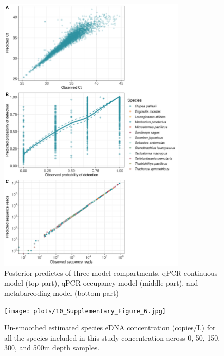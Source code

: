 \documentclass[9pt,twoside,lineno]{pnas-SI}
\begin{document}
\begin{figure}
\centering
\includegraphics[width=0.80\textwidth]{plots/9_Supplementary_Figure_5.jpg}
\caption{Posterior predictes of three model compartments, qPCR continuous model (top part), qPCR occupancy model (middle part), and metabarcoding model (bottom part)}
\end{figure}

\begin{figure}
\centering
\texttt{[image: plots/10\_Supplementary\_Figure\_6.jpg]}
\caption{Un-smoothed estimated species eDNA concentration (copies/L) for all the species included in this study concentration across 0, 50, 150, 300, and 500m depth samples.}
\end{figure}
\end{document}

